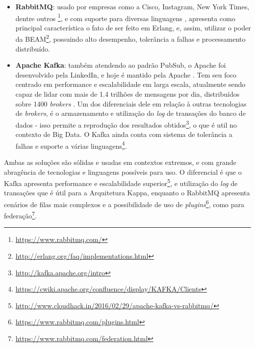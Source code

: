 \begin{itemize}

    \item \textbf{RabbitMQ}: usado por empresas como a Cisco, Instagram,
        New York Times, dentre outros \footnote{\url{https://www.rabbitmq.com/}},
        e com suporte para diversas linguagens \cite{zaitsev2014}, apresenta
        como principal característica o fato de ser feito em Erlang, e, assim,
        utilizar o poder da
        BEAM\footnote{\url{http://erlang.org/faq/implementations.html}},
        possuindo alto desempenho, tolerância a falhas e processamento
        distribuído.

    \item \textbf{Apache Kafka}: também atendendo ao padrão PubSub, o Apache
        foi desenvolvido pela LinkedIn, e hoje é mantido pela Apache
        \cite{koshy2016}. Tem seu foco centrado em performance e escalabilidade
        em larga escala, atualmente sendo capaz de lidar com mais de 1.4
        trilhões de mensagens por dia, distribuídos sobre 1400
        \textit{brokers} \cite{koshy2016}. Um dos diferenciais dele em relação
        à outras tecnologias de \textit{brokers}, é o armazenamento e
        utilização do \textit{log} de transações do banco de dados - isso
        permite a reprodução dos resultados
        obtidos\footnote{\url{http://kafka.apache.org/intro}}, o que é util no
        contexto de Big Data. O Kafka ainda conta com sistema de tolerância
        a falhas e suporte a várias
        linguagens\footnote{\url{https://cwiki.apache.org/confluence/display/KAFKA/Clients}}.

\end{itemize}

Ambas as soluções são sólidas e usadas em contextos extremos, e com grande
abragência de tecnologias e linguagens possíveis para uso. O diferencial é que
o Kafka apresenta performance e escalabilidade
superior\footnote{\url{http://www.cloudhack.in/2016/02/29/apache-kafka-vs-rabbitmq/}},
e utilização do \textit{log} de transações que é útil para a Arquitetura Kappa,
enquanto o RabbitMQ apresenta cenários de filas mais complexos e a
possibilidade de uso de
\textit{plugins}\footnote{\url{https://www.rabbitmq.com/plugins.html}},
como para federação\footnote{\url{https://www.rabbitmq.com/federation.html}}.


